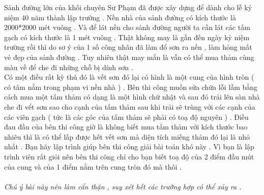 Sảnh đường lớn của khối chuyên Sư Phạm đã được xây dựng để dành cho lễ kỷ niệm 40 năm thành lập trường . Nền nhà của sảnh đường có kích thước là 2000*2000 mét vuông . Và để lát nền cho sảnh đường người ta cần lát các tấm gạch có kích thước là 1 mét vuông . Thật không may là gần đến ngày kỷ niệm trường rồi thì do sơ ý của 1 số công nhân đã làm đổ sơn ra nền , làm hỏng mất vẻ đẹp của sảnh đường . Tuy nhiên thật may mắn là vẫn có thể mua thảm cùng màu về để che đi những chỗ bị dính sơn .   
\\   Có một điều rất kỳ thú đó là vết sơn đó lại có hình là một cung của hình tròn ( có tâm nằm trong phạm vi nền nhà ) . Bên thi công muốn sửa chữa lỗi lầm bằng cách mua một tấm thảm có dạng là một hình chữ nhật và sau đó trải lên sàn nhà che đi vểt sơn sao cho cạnh của tấm thảm sau khi trải sẽ trùng với các cạnh của các viên gạch ( tức là các góc của tấm thảm sẽ phải có toạ độ nguyên ) . Điều đau đầu của bên thi công giờ là không biết mua tấm thảm với kích thước bao nhiêu thì là có thể lấp được hết vết sơn mà diện tích miếng thảm đó lại là nhỏ nhất . Bạn hãy lập trình giúp bên thi công giải bài toán khó này . Vì bạn là lập trình viên rất giỏi nên bên thi công chỉ cho bạn biết toạ độ của 2 điểm đầu mút của cung và của 1 điểm nằm trên cung tròn đó mà thôi .   
\\
\\\textit{    Chú ý bài này nên làm cẩn thận , suy xét hết các trường hợp có thể xảy ra .   }

\